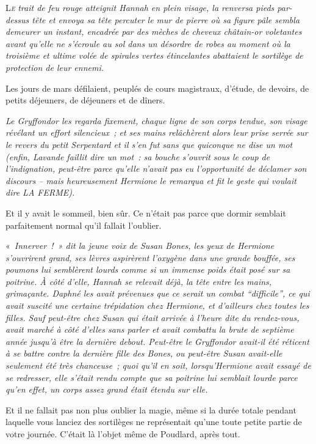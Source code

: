 
\lettrine{L}{\emph{e}} \emph{trait de feu rouge atteignit Hannah en plein visage, la renversa pieds par-dessus tête et envoya sa tête percuter le mur de pierre où sa figure pâle sembla demeurer un instant, encadrée par des mèches de cheveux châtain-or voletantes avant qu'elle ne s'écroule au sol dans un désordre de robes au moment où la troisième et ultime volée de spirales vertes étincelantes abattaient le sortilège de protection de leur ennemi.}

Les jours de mars défilaient, peuplés de cours magistraux, d'étude, de devoirs, de petits déjeuners, de déjeuners et de dîners.

\emph{Le Gryffondor les regarda fixement, chaque ligne de son corps tendue, son visage révélant un effort silencieux~; et ses mains relâchèrent alors leur prise serrée sur le revers du petit Serpentard et il s'en fut sans que quiconque ne dise un mot (enfin, Lavande faillit dire un mot~: sa bouche s'ouvrit sous le coup de l'indignation, peut-être parce qu'elle n'avait pas eu l'opportunité de déclamer son discours -- mais heureusement Hermione le remarqua et fit le geste qui voulait dire LA FERME).}

Et il y avait le sommeil, bien sûr. Ce n'était pas parce que dormir semblait parfaitement normal qu'il fallait l'oublier.

«~\emph{Innerver~!~» dit la jeune voix de Susan Bones, les yeux de Hermione s'ouvrirent grand, ses lèvres aspirèrent l'oxygène dans une grande bouffée, ses poumons lui semblèrent lourds comme si un immense poids était posé sur sa poitrine. À côté d'elle, Hannah se relevait déjà, la tête entre les mains, grimaçante. Daphné les avait prévenues que ce serait un combat “difficile”, ce qui avait suscité une certaine trépidation chez Hermione, et d'ailleurs chez toutes les filles. Sauf peut-être chez Susan qui était arrivée à l'heure dite du rendez-vous, avait marché à côté d'elles sans parler et avait combattu la brute de septième année jusqu'à être la dernière debout. Peut-être le Gryffondor avait-il été réticent à se battre contre la dernière fille des Bones, ou peut-être Susan avait-elle seulement été très chanceuse~; quoi qu'il en soit, lorsqu'Hermione avait essayé de se redresser, elle s'était rendu compte que sa poitrine lui semblait lourde parce qu'en effet, un corps assez grand était étendu sur elle.}

Et il ne fallait pas non plus oublier la magie, même si la durée totale pendant laquelle vous lanciez des sortilèges ne représentait qu'une toute petite partie de votre journée. C'était là l'objet même de Poudlard, après tout.

